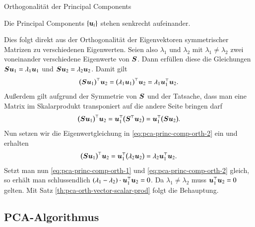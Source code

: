 \begin{frame}{Orthogonalität der Principal Components}{}
	\begin{mytheo}
		Die Principal Components $\{ \bm{u}_i \}$ stehen senkrecht aufeinander.
	\end{mytheo}

	\begin{myproof}
		Dies folgt direkt aus der Orthogonalität der Eigenvektoren symmetrischer Matrizen zu verschiedenen Eigenwerten.
		Seien also $\lambda_1$ und $\lambda_2$ mit $\lambda_1 \ne \lambda_2$ zwei voneinander verschiedene Eigenwerte
		von $\bm{S}$. Dann erfüllen diese die Gleichungen $\bm{S} \bm{u}_1 = \lambda_1 \bm{u}_1$ und $\bm{S} \bm{u}_2 = \lambda_2 \bm{u}_2$. Damit gilt
		\begin{equation} \label{eq:pca-princ-comp-orth-1}
			\bigl( \bm{S} \bm{u}_1 \bigr)^\top \bm{u}_2
				= \bigl( \lambda_1 \bm{u}_1 \bigr)^\top \bm{u}_2
				= \lambda_1 \bm{u}_1^\top \bm{u}_2.
		\end{equation}
		Außerdem gilt aufgrund der Symmetrie von $\bm{S}$ und der Tatsache, dass man eine Matrix im Skalarprodukt
		transponiert auf die andere Seite bringen darf
		\begin{equation} \label{eq:pca-princ-comp-orth-2}
			\bigl( \bm{S} \bm{u}_1 \bigr)^\top \bm{u}_2
				= \bm{u}_1^\top \bigl( \bm{S}^\top \bm{u}_2 \bigr)
				= \bm{u}_1^\top \bigl( \bm{S} \bm{u}_2 \bigr).
		\end{equation}
		Nun setzen wir die Eigenwertgleichung in \eqref{eq:pca-princ-comp-orth-2} ein und erhalten
		\begin{equation} \label{eq:pca-princ-comp-orth-3}
			\bigl( \bm{S} \bm{u}_1 \bigr)^\top \bm{u}_2
				= \bm{u}_1^\top \bigl( \lambda_2 \bm{u}_2 \bigr)
				= \lambda_2 \bm{u}_1^\top \bm{u}_2.
		\end{equation}
		Setzt man nun \eqref{eq:pca-princ-comp-orth-1} und \eqref{eq:pca-princ-comp-orth-2} gleich, so erhält man
		schlussendlich $(\lambda_1 - \lambda_2) \cdot \bm{u}_1^\top \bm{u}_2 = 0$. Da $\lambda_1 \ne \lambda_2$ muss
		$\bm{u}_1^\top \bm{u}_2 = 0$ gelten. Mit Satz \ref{th:pca-orth-vector-scalar-prod} folgt die Behauptung.
	\end{myproof}
\end{frame}


\subsection{PCA-Algorithmus}

